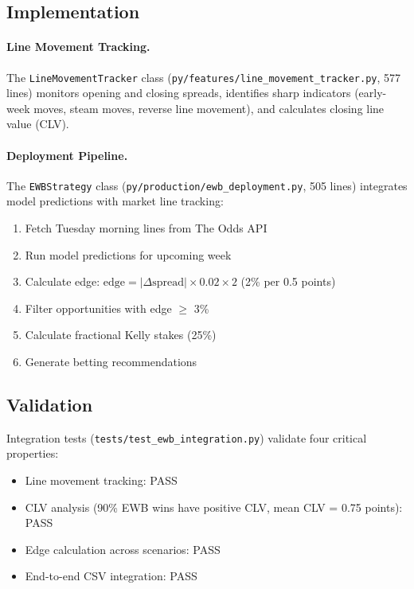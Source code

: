 \subsection{Implementation}

\paragraph{Line Movement Tracking.}
The \texttt{LineMovementTracker} class (\texttt{py/features/line\_movement\_tracker.py}, 577 lines) monitors opening and closing spreads, identifies sharp indicators (early-week moves, steam moves, reverse line movement), and calculates closing line value (CLV).

\paragraph{Deployment Pipeline.}
The \texttt{EWBStrategy} class (\texttt{py/production/ewb\_deployment.py}, 505 lines) integrates model predictions with market line tracking:
\begin{enumerate}
  \item Fetch Tuesday morning lines from The Odds API
  \item Run model predictions for upcoming week
  \item Calculate edge: $\text{edge} = |\Delta\text{spread}| \times 0.02 \times 2$ (2\% per 0.5 points)
  \item Filter opportunities with edge $\geq$ 3\%
  \item Calculate fractional Kelly stakes (25\%)
  \item Generate betting recommendations
\end{enumerate}

\subsection{Validation}

Integration tests (\texttt{tests/test\_ewb\_integration.py}) validate four critical properties:
\begin{itemize}
  \item Line movement tracking: PASS
  \item CLV analysis (90\% EWB wins have positive CLV, mean CLV = 0.75 points): PASS
  \item Edge calculation across scenarios: PASS
  \item End-to-end CSV integration: PASS
\end{itemize}


